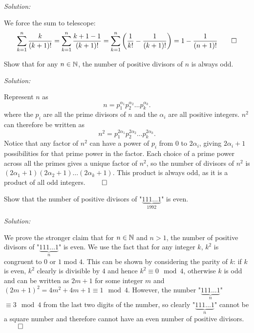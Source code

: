 \documentclass[12pt]{scrartcl}
\newenvironment{problem}[2][Problem]{\begin{trivlist}
\item[\hskip \labelsep {\bfseries #1}\hskip \labelsep {\bfseries #2.}]}{\end{trivlist}}
\newenvironment{sol}
    {\emph{Solution:}
    }
    {
    \qedhere
    }
\begin{document}
\begin{sol}
We force the sum to telescope: 
\[
	\sum_{k=1}^n \frac{k}{(k+1)!} = \sum_{k=1}^n \frac{k + 1 - 1}{(k+1)!} = \sum_{k=1}^n \left(\frac{1}{k!} - \frac{1}{(k+1)!}\right) = 1 - \frac{1}{(n+1)!} \qed
\]
\end{sol}



\begin{problem}{12}
Show that for any $n \in \mathbb N$, the number of positive divisors of $n$ is always odd. 
\end{problem}

\begin{sol}
Represent $n$ as 
\[
	n = p_1^{\alpha_1} p_2^{\alpha_2} \ldots p_k^{\alpha_k}.
\]
where the $p_i$ are all the prime divisors of $n$ and the $\alpha_i$ are all positive integers. $n^2$ can therefore be written as
\[
	n^2 = p_1^{2\alpha_1} p_2^{2\alpha_2} \ldots p_k^{2\alpha_k}.
\]
Notice that any factor of $n^2$ can have a power of $p_i$ from $0$ to $2\alpha_i$, giving $2\alpha_i + 1$ possibilities for that prime power in the factor. Each choice of a prime power across all the primes gives a unique factor of $n^2$, so the number of divisors of $n^2$ is $(2\alpha_1 + 1)(2\alpha_2 + 1) \ldots (2\alpha_k + 1)$. This product is always odd, as it is a product of all odd integers. $\qed$
\end{sol}

\begin{problem}{13}
Show that the number of positive divisors of "$\underbrace{111\ldots 1}_{1992}$" is even. 
\end{problem}

\begin{sol}
We prove the stronger claim that for $n \in \mathbb N$ and $n > 1$, the number of positive divisors of "$\underbrace{111\ldots 1}_{n}$" is even. We use the fact that for any integer $k$, $k^2$ is congruent to $0$ or $1$ mod $4$. This can be shown by considering the parity of $k$: if $k$ is even, $k^2$ clearly is divisible by $4$ and hence $k^2 \equiv 0 \mod 4$, otherwise $k$ is odd and can be written as $2m + 1$ for some integer $m$ and $(2m+1)^2 = 4m^2 + 4m + 1 \equiv 1 \mod 4$. However, the number "$\underbrace{111\ldots 1}_{n}$" $\equiv 3 \mod 4$ from the last two digits of the number, so clearly "$\underbrace{111\ldots 1}_{n}$" cannot be a square number and therefore cannot have an even number of positive divisors. $\qed$
\end{sol}
\end{document}
